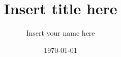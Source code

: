 \author{Insert your name here}
\title{Insert title here}

\def\type{Seminar}

\def\originalPaper{Xie:2008:SBS}%

\englishtrue%

\def\ResearchGroup{System Security}
\def\Supervisor{Prof.~Dr.-Ing.~Juraj Somorovsky}

\date{\today}
